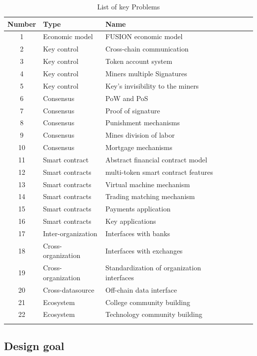 \documentclass[a4paper,12pt]{article}
\begin{document}
\begin{table}[!hbp]
  \caption{List of key Problems}
  \label{tbl:keyquestions}
  \centering
  \begin{tabular}{cp{4cm}lp{3cm}lp{5cm}}
\hline
Number & Type & Name \\
\hline
1 & Economic model & FUSION economic model \\
2 & Key control & Cross-chain communication \\
3 & Key control & Token account system \\
4 & Key control & Miners multiple Signatures\\
5 & Key control & Key's invisibility to the miners \\
6 & Consensus & PoW and PoS\\
7 & Consensus & Proof of signature\\
8 & Consensus & Punishment mechanisms \\
9 & Consensus & Mines division of labor \\
10 & Consensus & Mortgage mechanisms \\
11 & Smart contract & Abstract financial contract model \\
12 & Smart contracts & multi-token smart contract features \\
13 & Smart contracts & Virtual machine mechanism \\
14 & Smart contracts & Trading matching mechanism\\
15 & Smart contracts & Payments application \\
16 & Smart contracts & Key applications \\
17 & Inter-organization & Interfaces with banks \\
18 & Cross-organization & Interfaces with exchanges\\
19 & Cross-organization & Standardization of organization interfaces\\
20 & Cross-datasource & Off-chain data interface \\
21 & Ecosystem & College community building \\
22 & Ecosystem & Technology community building \\  
\hline
\\
 \end{tabular}
\end{table}


\subsection{Design goal}
\end{document}
